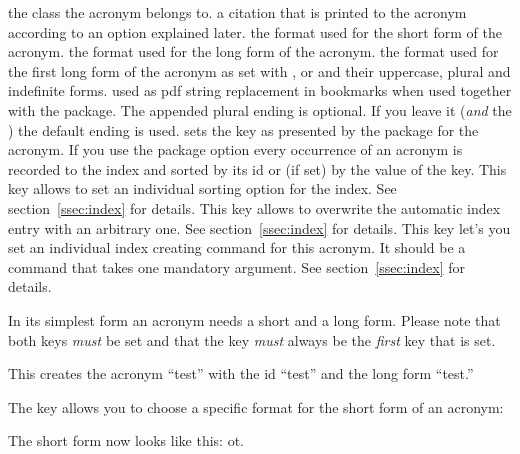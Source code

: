 \documentclass[load-preamble+,scrartcl={DIV10}]{cnltx-doc}
\begin{document}
\begin{options}
    the class the acronym belongs to.
    a citation that is printed to the acronym according to an option explained
    later.
    the format used for the short form of the acronym.
    the format used for the long form of the acronym.
    the format used for the first long form of the acronym as set with ,
     or  and their uppercase, plural and indefinite forms.
    used as \acs{pdf} string replacement in bookmarks when used together with the
     package.  The appended plural ending is optional.  If you
   leave it (\emph{and} the \code{/}) the default ending is used.
    sets the  key as presented by the  package
    for the acronym.
    If you use the package option  every
    occurrence of an acronym is recorded to the index and sorted by its
    \ac{id} or (if set) by the value of the  key.  This key
    allows to set an individual sorting option for the index.  See
    section~\ref{ssec:index} for details.
    This key allows to overwrite the automatic index entry
    with an arbitrary one.  See section~\ref{ssec:index} for details.
    This key let's you set an individual index creating
    command for this acronym.  It should be a command that takes one mandatory
    argument.  See section~\ref{ssec:index} for details.
\end{options}

In its simplest form an acronym needs a short and a long form.  Please note
that both keys \emph{must} be set and that the  key \emph{must}
always be the \emph{first} key that is set.
\begin{sourcecode}
\end{sourcecode}
This creates the acronym ``\acs{test}'' with the \acs{id} ``test'' and the
long form ``\acl{test}.''

The  key allows you to choose a specific format for the short
form of an acronym:
\begin{sourcecode}
\end{sourcecode}
The short form now looks like this: \acs{ot}.
\end{document}
